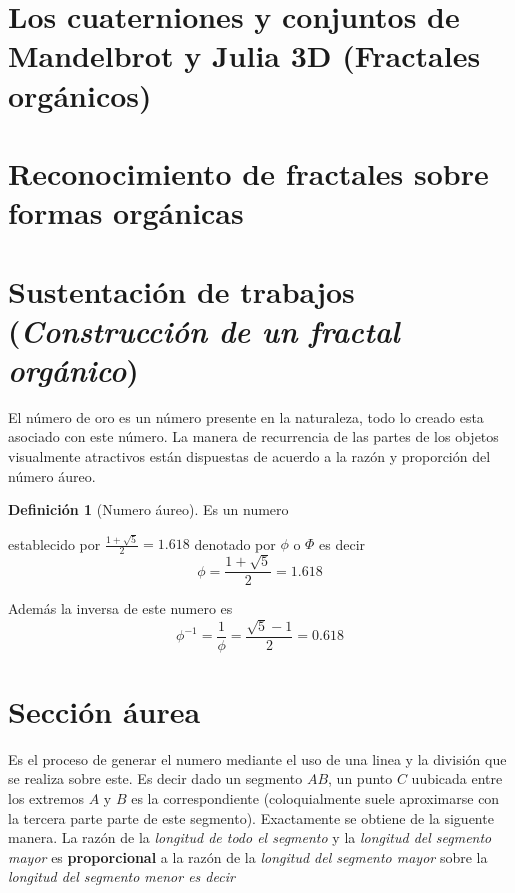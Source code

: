 \documentclass[
  11pt,
]{krantz}
\theoremstyle{definition}
\newtheorem{definition}{Definición}[chapter]
\theoremstyle{definition}
\theoremstyle{definition}
\theoremstyle{definition}
\theoremstyle{remark}
\begin{document}
\hypertarget{los-cuaterniones-y-conjuntos-de-mandelbrot-y-julia-3d-fractales-orguxe1nicos}{%
\section{Los cuaterniones y conjuntos de Mandelbrot y Julia 3D (Fractales orgánicos)}\label{los-cuaterniones-y-conjuntos-de-mandelbrot-y-julia-3d-fractales-orguxe1nicos}}

\hypertarget{reconocimiento-de-fractales-sobre-formas-orguxe1nicas}{%
\section{Reconocimiento de fractales sobre formas orgánicas}\label{reconocimiento-de-fractales-sobre-formas-orguxe1nicas}}

\hypertarget{sustentaciuxf3n-de-trabajos-1}{%
\section{\texorpdfstring{Sustentación de trabajos (\emph{Construcción de un fractal orgánico})}{Sustentación de trabajos ()}}\label{sustentaciuxf3n-de-trabajos-1}}

El número de oro  es un número presente en la naturaleza, todo lo creado esta asociado con este número. La manera de recurrencia de las partes de los objetos visualmente atractivos están dispuestas de acuerdo a la razón y proporción del número áureo.

\begin{definition}[Numero áureo]
\protect\hypertarget{def:aureo}{}\label{def:aureo}Es un numero
\end{definition}

establecido por \(\frac{1+\sqrt{5}}{2}=1.618\) denotado por \(\phi\) o \(\Phi\) es decir \[\phi=\frac{1+\sqrt{5}}{2}=1.618\]

Además la inversa de este numero es \[\phi^{-1}=\frac{1}{\phi}=\frac{\sqrt{5}-1}{2}=0.618\]

\hypertarget{secciuxf3n-uxe1urea}{%
\section{Sección áurea}\label{secciuxf3n-uxe1urea}}

Es el proceso de generar el numero mediante el uso de una linea y la división que se realiza sobre este. Es decir dado un segmento \(AB\), un punto \(C\) uubicada entre los extremos \(A\) y \(B\) es la correspondiente (coloquialmente suele aproximarse con la tercera parte parte de este segmento). Exactamente se obtiene de la siguente manera. La razón de la \emph{longitud de todo el segmento} y la \emph{longitud del segmento mayor} es \textbf{proporcional} a la razón de la \emph{longitud del segmento mayor} sobre la \emph{longitud del segmento menor es decir}
\end{document}
